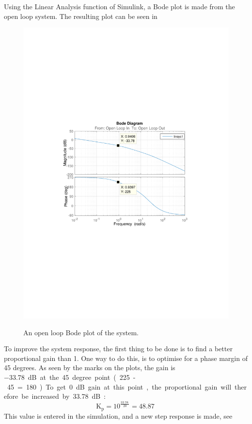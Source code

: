 Using the Linear Analysis function of Simulink, a Bode plot is made from the open loop system. The resulting plot can be seen in 
\begin{figure}[H]
  \centering
  {
    \includegraphics[width=1.4\textwidth]{figures/distanceBode1.pdf}
  }
  \caption{An open loop Bode plot of the system.}
  \label{SimulationSteeringB1}
\end{figure}
To improve the system response, the first thing to be done is to find a better proportional gain than 1. One way to do this, is to optimise for a phase margin of 45 degrees. As seen by the marks on the plots, the gain is \SI{-33,78}dB at the 45 degree point (225-45=180). To get 0 dB gain at this point, the proportional gain will therefore be increased by  \SI{33,78}dB:
$$\text{K}_\text{p}=10^{\frac{\SI{33,78}{}}{20}} = \SI{48,87}{}$$
This value is entered in the simulation, and a new step response is made, see 

